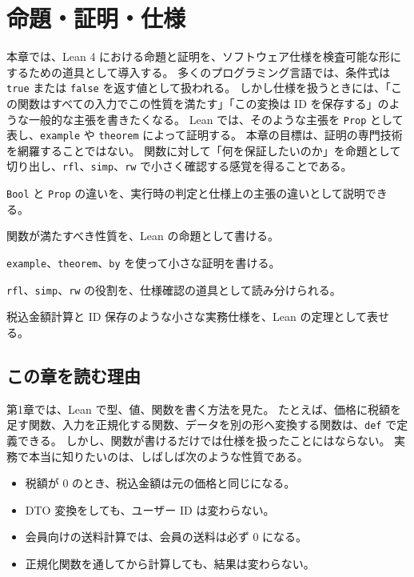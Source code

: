 \chapter{命題・証明・仕様}
\label{chap:ch02_props_specs}

\begin{chapterabstract}
本章では、Lean 4 における命題と証明を、ソフトウェア仕様を検査可能な形にするための道具として導入する。
多くのプログラミング言語では、条件式は \texttt{true} または \texttt{false} を返す値として扱われる。
しかし仕様を扱うときには、「この関数はすべての入力でこの性質を満たす」「この変換は ID を保存する」のような一般的な主張を書きたくなる。
Lean では、そのような主張を \texttt{Prop} として表し、\texttt{example} や \texttt{theorem} によって証明する。
本章の目標は、証明の専門技術を網羅することではない。
関数に対して「何を保証したいのか」を命題として切り出し、\texttt{rfl}、\texttt{simp}、\texttt{rw} で小さく確認する感覚を得ることである。
\end{chapterabstract}

\begin{learninggoals}
\item \texttt{Bool} と \texttt{Prop} の違いを、実行時の判定と仕様上の主張の違いとして説明できる。
\item 関数が満たすべき性質を、Lean の命題として書ける。
\item \texttt{example}、\texttt{theorem}、\texttt{by} を使って小さな証明を書ける。
\item \texttt{rfl}、\texttt{simp}、\texttt{rw} の役割を、仕様確認の道具として読み分けられる。
\item 税込金額計算と ID 保存のような小さな実務仕様を、Lean の定理として表せる。
\end{learninggoals}

\section{この章を読む理由}

第1章では、Lean で型、値、関数を書く方法を見た。
たとえば、価格に税額を足す関数、入力を正規化する関数、データを別の形へ変換する関数は、\texttt{def} で定義できる。
しかし、関数が書けるだけでは仕様を扱ったことにはならない。
実務で本当に知りたいのは、しばしば次のような性質である。

\begin{itemize}
\item 税額が 0 のとき、税込金額は元の価格と同じになる。
\item DTO 変換をしても、ユーザー ID は変わらない。
\item 会員向けの送料計算では、会員の送料は必ず 0 になる。
\item 正規化関数を通してから計算しても、結果は変わらない。
\end{itemize}

